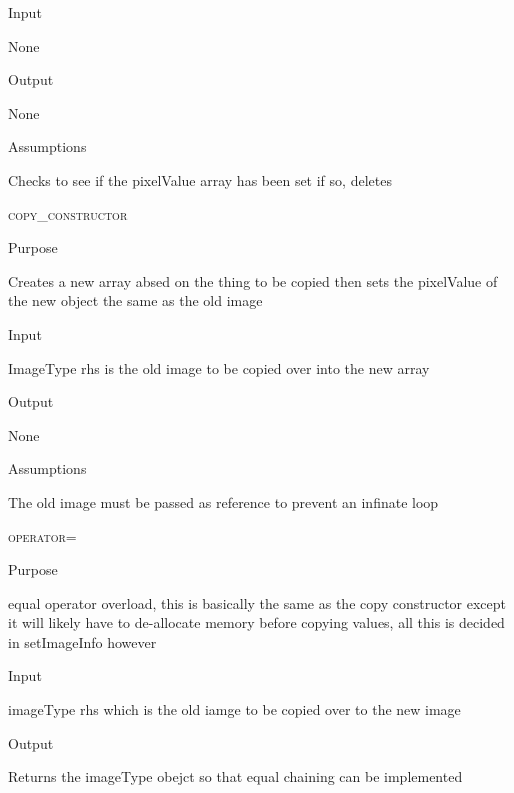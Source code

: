 \documentclass[pdftex, 11pt]{article}
\begin{document}
\begin{description}
\begin{description}
			\item{Input}

				None

			\item{Output}

				None

			\item{Assumptions}

				Checks to see if the pixelValue array has been set
				if so, deletes

		\end{description}


	\item{\textsc{copy\_constructor}}
		\begin{description}
			\item{Purpose}
		
				Creates a new array absed on the thing to be copied
				then sets the pixelValue of the new object the same as
				the old image

			\item{Input}

				ImageType rhs is the old image to be copied over into
				the new array


			\item{Output}

				None

			\item{Assumptions}

				The old image must be passed as reference to prevent
				an infinate loop


		\end{description}


	\item{\textsc{operator=}}
		\begin{description}
			\item{Purpose}

				equal operator overload, this is basically
				the same as the copy constructor
				except it will likely have to 
				de-allocate memory before copying values, all
				this is decided in setImageInfo however

			\item{Input}

				imageType rhs which is the old iamge to be 
				copied over to the new image

			\item{Output}

				Returns the imageType obejct so that
				equal chaining can be implemented



\end{description}
\end{description}
\end{document}
